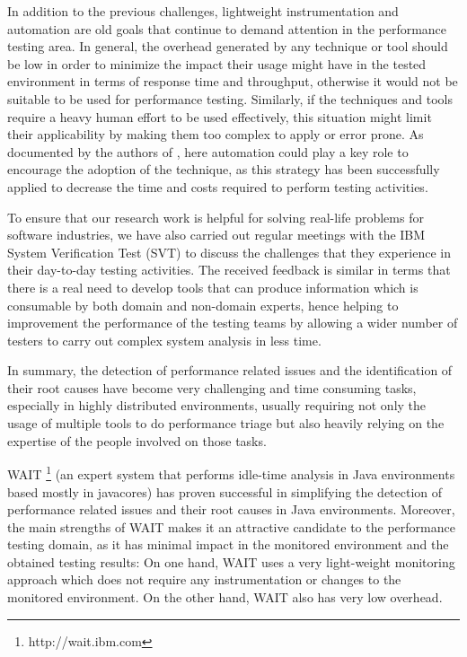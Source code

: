 \documentclass[runningheads,a4paper]{llncs}
\begin{document}
In addition to the previous challenges, lightweight instrumentation and
automation are old goals that continue to demand attention in the performance
testing area. In general, the overhead generated by any technique or tool
should be low in order to minimize the impact their usage might have in the
tested environment in terms of response time and throughput, otherwise it would not be
suitable to be used for performance testing. Similarly, if the techniques and
tools require a heavy human effort to be used effectively, this situation might limit 
their applicability by making them too complex to apply or error prone. As
documented by the authors of \cite{Shahamiri1}, here automation could play a key
role to encourage the adoption of the technique, as this strategy has been
successfully applied to decrease the time and costs required to perform
testing activities.

To ensure that our research work is helpful for solving real-life problems for
software industries, we have also carried out regular meetings with the IBM
System Verification Test (SVT) to discuss the challenges that they experience in
their day-to-day testing activities. The received feedback is similar in terms
that there is a real need to develop tools that can produce information which is
consumable by both domain and non-domain experts, hence helping to improvement the 
performance of the testing teams by allowing a wider number of testers to carry out 
complex system analysis in less time.

In summary, the detection of performance related issues and the identification
of their root causes have become very challenging and time consuming tasks,
especially in highly distributed environments, usually requiring not only the
usage of multiple tools to do performance triage but also heavily relying on
the expertise of the people involved on those tasks.

WAIT \footnote{http://wait.ibm.com} (an expert system that performs idle-time
analysis in Java environments based mostly in javacores) has proven successful
in simplifying the detection of performance related issues and their root causes 
in Java environments. Moreover, the main strengths of WAIT makes it an attractive 
candidate to the performance testing domain, as it has minimal impact in the
monitored environment and the obtained testing results: On one hand, WAIT uses a 
very light-weight monitoring approach which does not require any instrumentation 
or changes to the monitored environment. On the other hand, WAIT also has very
low overhead.
\end{document}

